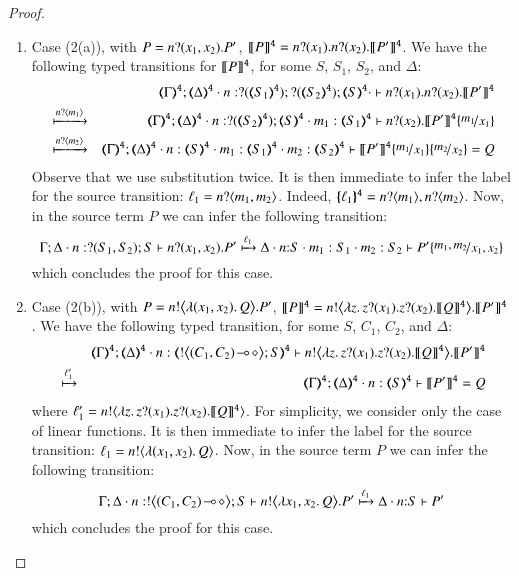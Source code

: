 \begin{proof}
\begin{enumerate}[1.]
\item Case (2(a)), with $P =  \binp{n}{x_1, x_2} P' $, 
$\pmap{P}{4} = 
		\binp{n}{x_1}  \binp{n}{x_2}  \pmap{P'}{4}$.
		We have  the following typed transitions for $\pmap{P}{4}$, for some $S$, $S_1$, $S_2$, and $\Delta$:
\begin{eqnarray*}
& & \tmap{\Gamma}{4}; 
\tmap{\Delta}{4} \cat 
n:\btinp{\tmap{S_1}{4}}\btinp{\tmap{S_2}{4}}\tmap{S}{4} \cat
\proves 
\binp{n}{x_1} \binp{n}{x_2}\pmap{P'}{4} \\
& \hby{\bactinp{n}{m_1}} & 
\tmap{\Gamma}{4}; 
\tmap{\Delta}{4} \cat 
n:\btinp{\tmap{S_2}{4}}\tmap{S}{4} \cat
m_1:\tmap{S_1}{4}
\proves 
\binp{n}{x_2}\pmap{P'}{4} \subst{m_1}{x_1} \\
& \hby{\bactinp{n}{m_2}} & 
\tmap{\Gamma}{4}; 
\tmap{\Delta}{4} \cat n:\tmap{S}{4} \cat
m_1:  \tmap{S_1}{4} \cat
m_2: \tmap{S_2}{4}
\proves 
\pmap{P'}{4} \subst{m_1}{x_1}\subst{m_2}{x_2} = Q
\end{eqnarray*}
Observe that we use substitution %
twice.
It is then immediate to infer the label for the source transition:
$\ell_1 = \bactinp{n}{m_1,m_2}$. Indeed, $\mapa{\ell_1}{4} = \bactinp{n}{m_1}, \bactinp{n}{m_2}$.
Now, in the source term $P$ we can infer the following transition:
$$
\stytra{\Gamma}{\ell_1}{\Delta \cat n:\btinp{S_1, S_2}S}{\binp{n}{x_1, x_2} P' }{\Delta\cat n{:}S \cat m_1:S_1 \cat m_2:S_2}{P'\subst{m_1,m_2}{x_1, x_2}}
$$
which concludes the proof for this case.


\item Case (2(b)), with $P =  \bbout{n}{\abs{(x_1,x_2)} Q} P' $, 
$\pmap{P}{4} = 
		\bbout{n}{\abs{z}\binp{z}{x_1}\binp{z}{x_2} \pmap{Q}{4}} \pmap{P'}{4}$.
		We have the following  typed transition, for some $S$, $C_1$, $C_2$, and $\Delta$:
\begin{eqnarray*}
& & \tmap{\Gamma}{4}; 
\tmap{\Delta}{4}\cat n:\tmap{\bbtout{\lhot{(C_1,  C_2)}} S}{4}
\proves 
\bbout{n}{\abs{z}\binp{z}{x_1}\binp{z}{x_2} \pmap{Q}{4}} \pmap{P'}{4} \\
& \hby{\ell'_1} & 
\tmap{\Gamma}{4}; 
\tmap{\Delta}{4}\cat n:\tmap{ S}{4} 
\proves 
\pmap{P'}{4} = Q
\end{eqnarray*}
where
$\ell'_1 = \bactout{n}{\abs{z}\binp{z}{x_1} \binp{z}{x_2} \pmap{Q}{4}}$.
For simplicity, we consider only the case of linear functions.
It is then immediate to infer the label for the source transition:
$\ell_1 = \bactout{n}{\abs{(x_1,  x_2)}{Q}} $. 
Now, in the source term $P$ we can infer the following transition:
$$
\stytra{\Gamma}{\ell_1}{\Delta\cat n:\bbtout{\lhot{(C_1,  C_2)}} S}{ \bbout{n}{\abs{x_1,x_2} Q} P'}{\Delta\cat n{:}S}{P'}
$$
which concludes the proof for this case.
\end{enumerate}
\end{proof}


